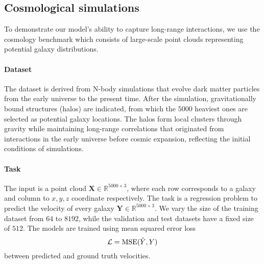 \subsection{Cosmological simulations}

To demonstrate our model's ability to capture long-range interactions, we use the cosmology benchmark \cite{Balla2024ACB} which consists of large-scale point clouds representing potential galaxy distributions.

\vspace{-5pt}
\paragraph{Dataset}
The dataset is derived from N-body simulations that evolve dark matter particles from the early universe to the present time. After the simulation, gravitationally bound structures (halos) are indicated, from which the $5000$ heaviest ones are selected as potential galaxy locations. The halos form local clusters through gravity while maintaining long-range correlations that originated from interactions in the early universe before cosmic expansion, reflecting the initial conditions of simulations.

\vspace{-5pt}
\paragraph{Task}
The input is a point cloud $\mathbf{X} \in \mathbb{R}^{5000 \times 3}$, where each row corresponds to a galaxy and column to $x,y,z$ coordinate respectively. The task is a regression problem to predict the velocity of every galaxy $\mathbf{Y} \in \mathbb{R}^{5000 \times 3}$. We vary the size of the training dataset from $64$ to $8192$, while the validation and test datasets have a fixed size of $512$. The models are trained using mean squared error loss
\vspace{-2pt}
\begin{equation*}
    \mathcal{L} = \text{MSE}(\hat{Y}, Y)
\vspace{-2pt}
\end{equation*}
between predicted and ground truth velocities.

\vspace{-5pt}
